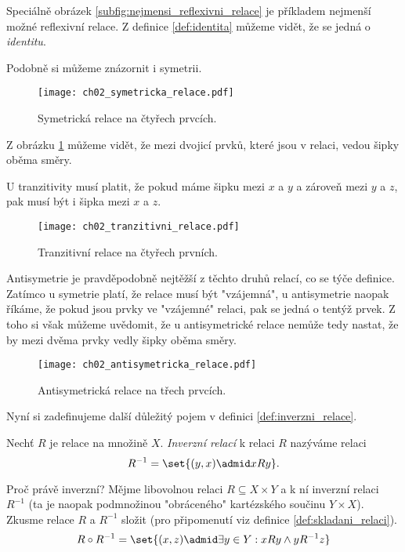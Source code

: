 Speciálně obrázek \ref{subfig:nejmensi_reflexivni_relace} je příkladem nejmenší možné reflexivní relace. Z definice \ref{def:identita} můžeme vidět, že se jedná o \emph{identitu}.\par
Podobně si můžeme znázornit i symetrii.
\begin{figure}[H]
    \centering
    \texttt{[image: ch02\_symetricka\_relace.pdf]}
    \caption{Symetrická relace na čtyřech prvcích.}
    \label{fig:priklad_symetricke_relace}
\end{figure}
Z obrázku \ref{fig:priklad_symetricke_relace} můžeme vidět, že mezi dvojicí prvků, které jsou v relaci, vedou šipky oběma směry.\par
U tranzitivity musí platit, že pokud máme šipku mezi $x$ a $y$ a zároveň mezi $y$ a $z$, pak musí být i šipka mezi $x$ a $z$.
\begin{figure}[H]
    \centering
    \texttt{[image: ch02\_tranzitivni\_relace.pdf]}
    \caption{Tranzitivní relace na čtyřech prvních.}
    \label{fig:priklad_tranzitivni_relace}
\end{figure}
Antisymetrie je pravděpodobně nejtěžší z těchto druhů relací, co se týče definice. Zatímco u symetrie platí, že relace musí být "vzájemná", u antisymetrie naopak říkáme, že pokud jsou prvky ve "vzájemné" relaci, pak se jedná o tentýž prvek. Z toho si však můžeme uvědomit, že u antisymetrické relace nemůže tedy nastat, že by mezi dvěma prvky vedly šipky oběma směry.
\begin{figure}[H]
    \centering
    \texttt{[image: ch02\_antisymetricka\_relace.pdf]}
    \caption{Antisymetrická relace na třech prvcích.}
    \label{fig:priklad_antisymetricke_relace}
\end{figure} 
Nyní si zadefinujeme další důležitý pojem v definici \ref{def:inverzni_relace}.
\begin{definition}\label{def:inverzni_relace}
    Nechť $R$ je relace na množině $X$. \emph{Inverzní relací} k relaci $R$ nazýváme relaci
    \begin{equation*}
        R^{-1}=\set{(y,x) \admid xRy}.
    \end{equation*}
\end{definition}
Proč právě inverzní? Mějme libovolnou relaci $R\subseteq X\times Y$ a k ní inverzní relaci $R^{-1}$ (ta je naopak podmnožinou "obráceného" kartézského součinu $Y\times X$). Zkusme relace $R$ a $R^{-1}$ složit (pro připomenutí viz definice \ref{def:skladani_relaci}).
\begin{equation*}
    R\circ R^{-1}=\set{(x,z) \admid \exists y\in Y: xRy \land yR^{-1}z}
\end{equation*}
